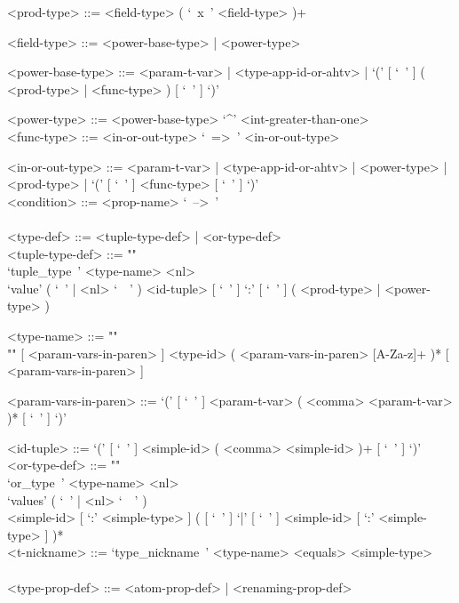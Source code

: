 \documentclass{article}
\begin{document}
\begin{grammar}
<prod-type> ::= <field-type> ( `\ x\ ' <field-type> )+

<field-type> ::= <power-base-type> | <power-type>

<power-base-type> ::=
<param-t-var> | <type-app-id-or-ahtv> |
`(' [ `\ ' ] ( <prod-type> | <func-type> ) [ `\ ' ] `)'

<power-type> ::= <power-base-type> `^' <int-greater-than-one>
\\

<func-type> ::= <in-or-out-type> `\ =>\ ' <in-or-out-type>

<in-or-out-type> ::=
<param-t-var> | <type-app-id-or-ahtv> | <power-type> | <prod-type> |
`(' [ `\ ' ] <func-type>  [ `\ ' ] `)'
\\

<condition> ::= <prop-name> `\ -->\ '
\\
\\

\newpage
<type-def> ::= <tuple-type-def> | <or-type-def>
\\

<tuple-type-def> ::= ""\\
`tuple_type\ ' <type-name> <nl> \\
`value' ( `\ ' | <nl> `\ \ ' )
<id-tuple> [ `\ ' ] `:' [ `\ ' ] ( <prod-type> | <power-type> )

<type-name> ::= ""\\""
[ <param-vars-in-paren> ] <type-id> ( <param-vars-in-paren> [A-Za-z]+ )*
[ <param-vars-in-paren> ]

<param-vars-in-paren> ::=
`(' [ `\ ' ] <param-t-var> ( <comma> <param-t-var> )* [ `\ ' ] `)'

<id-tuple> ::= `(' [ `\ ' ] <simple-id> ( <comma> <simple-id> )+ [ `\ ' ] `)'
\\

<or-type-def> ::= ""\\
`or_type\ ' <type-name> <nl> \\
`values' ( `\ ' | <nl> `\ \ ' ) \\
<simple-id> [ `:' <simple-type> ]
( [ `\ ' ] `|' [ `\ ' ] <simple-id> [ `:' <simple-type> ] )*
\\

<t-nickname> ::=
`type_nickname\ ' <type-name> <equals> <simple-type>
\\\\

<type-prop-def> ::= <atom-prop-def> | <renaming-prop-def>
\\


\end{grammar}
\end{document}
